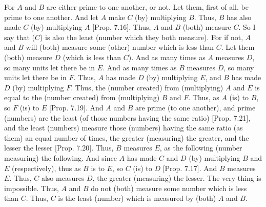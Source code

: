 \begin{Parallel}{}{}
{For $A$ and $B$ are either prime to one another, or not. Let them, first of all,
be prime to one another. And let $A$ make $C$ (by) multiplying $B$. Thus,
$B$ has also made $C$ (by) multiplying $A$ [Prop. 7.16]. Thus, $A$ and $B$ (both) measure $C$. So
I say that ($C$) is also the least (number which they both measure).
For if not, $A$ and $B$ will (both) measure some (other) number which is less than $C$. Let them (both) measure $D$ (which is less than $C$). And as many times
as $A$ measures $D$, so many units let there be in $E$. And as many times as $B$
measures $D$, so many units let there be in $F$. Thus, $A$ has made $D$ (by)
multiplying $E$, and $B$ has made $D$ (by) multiplying $F$. Thus, the
(number created) from (multiplying) $A$ and $E$ is equal to the (number created)
from (multiplying) $B$ and $F$. Thus, as $A$ (is) to $B$, so $F$ (is) to $E$ [Prop. 7.19]. And $A$ and $B$ are prime (to one another), and prime (numbers) are the least (of those numbers having
the same ratio)  [Prop. 7.21], and the
least (numbers) measure those (numbers) having the same
ratio (as them) an equal number of times, the greater (measuring) the greater,
and
the lesser the lesser [Prop. 7.20].
Thus, $B$ measures $E$, as the following (number measuring) the following.
And since $A$ has made $C$ and $D$ (by) multiplying $B$ and $E$ (respectively),
thus as $B$ is to $E$, so $C$ (is) to $D$ [Prop. 7.17]. 
And $B$ measures $E$. Thus, $C$ also measures $D$, the greater (measuring) the
lesser. The very thing is impossible. Thus, $A$ and $B$ do not (both) measure some
number which is less than $C$. Thus, $C$ is the least (number) which is
measured by (both) $A$ and $B$.

\epsfysize=1.5in
\centerline{}

}
\end{Parallel}
